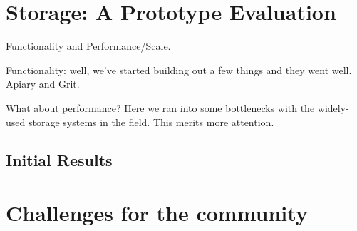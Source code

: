 \documentclass{sig-alternate}
\begin{document}
\section{Storage: A Prototype Evaluation}
\label{sec:storage}
Functionality and Performance/Scale.

Functionality: well, we've started building out a few things and they went well.  Apiary and Grit.

What about performance? Here we ran into some bottlenecks with the widely-used storage systems in the field.  This merits more attention.

\subsection{Initial Results}
\label{sec:perf}
\section{Challenges for the community}

\end{document}
